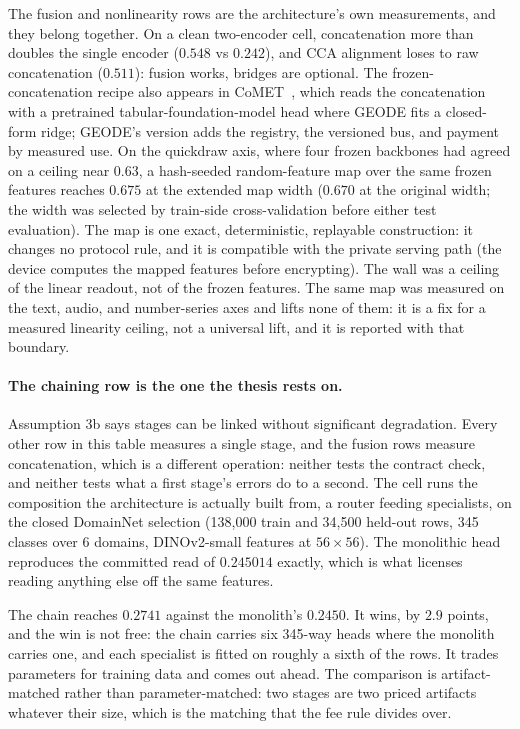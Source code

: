 \documentclass[11pt]{article}
\begin{document}
The fusion and nonlinearity rows are the architecture's own
measurements, and they belong together. On a clean two-encoder cell, concatenation
more than doubles the single encoder ($0.548$ vs $0.242$), and
CCA alignment loses to raw concatenation ($0.511$): fusion works,
bridges are optional. The frozen-concatenation recipe also
appears in CoMET~\cite{comet2026}, which reads the
concatenation with a pretrained tabular-foundation-model head
where GEODE fits a closed-form ridge; GEODE's version adds the
registry, the versioned bus, and payment by measured use. On the quickdraw axis, where four frozen
backbones had agreed on a ceiling near $0.63$, a hash-seeded
random-feature map over the same frozen features reaches $0.675$
at the extended map width ($0.670$ at the original width; the
width was selected by train-side cross-validation before either
test evaluation). The map is one exact, deterministic, replayable
construction: it changes no protocol rule, and it is compatible
with the private serving path (the device computes the mapped
features before encrypting). The wall was a ceiling of the linear
readout, not of the frozen features. The same map was measured on
the text, audio, and number-series axes and lifts none of them:
it is a fix for a measured linearity ceiling, not a universal
lift, and it is reported with that boundary.

\paragraph{The chaining row is the one the thesis rests on.}
Assumption 3b says stages can be linked without significant
degradation. Every other row in this table measures a single
stage, and the fusion rows measure concatenation, which is a
different operation: neither tests the contract check, and neither
tests what a first stage's errors do to a second. The cell
runs the composition the architecture is actually built from, a
router feeding specialists, on the closed DomainNet selection
(138,000 train and 34,500 held-out rows, 345 classes over 6
domains, DINOv2-small features at $56\times56$). The monolithic
head reproduces the committed read of $0.245014$ exactly, which is
what licenses reading anything else off the same features.

The chain reaches $0.2741$ against the monolith's $0.2450$. It
wins, by $2.9$ points, and the win is not free: the chain carries
six 345-way heads where the monolith carries one, and each
specialist is fitted on roughly a sixth of the rows. It trades
parameters for training data and comes out ahead. The comparison
is artifact-matched rather than parameter-matched: two stages
are two priced artifacts whatever their size, which is the
matching that the fee rule divides over.
\end{document}
